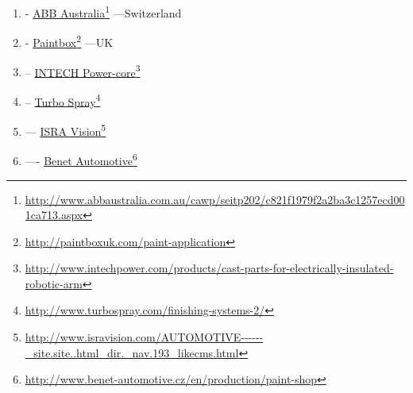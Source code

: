 \documentclass[a4paper,10pt]{article}
\newcommand\fnurl[2]{%
  \href{#1}{#2}\footnote{\url{#1}}%
}
\begin{document}
\begin{multicols}{4}
\begin{enumerate}
  \item -\fnurl{http://www.abbaustralia.com.au/cawp/seitp202/c821f1979f2a2ba3c1257ecd001ca713.aspx}{ABB Australia}---Switzerland
  \item -\fnurl{http://paintboxuk.com/paint-application}{Paintbox}---UK
  \item --\fnurl{http://www.intechpower.com/products/cast-parts-for-electrically-insulated-robotic-arm}{INTECH Power-core}
  \item --\fnurl{http://www.turbospray.com/finishing-systems-2/}{Turbo Spray} 
  \item ---\fnurl{http://www.isravision.com/AUTOMOTIVE------_site.site..html_dir._nav.193_likecms.html}{ISRA Vision} 
  \item ----\fnurl{http://www.benet-automotive.cz/en/production/paint-shop}{Benet Automotive} 
\end{enumerate}
\end{multicols}
\end{document}
